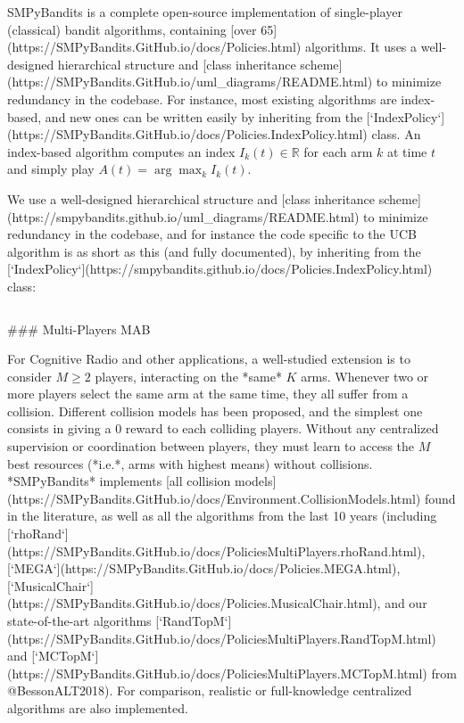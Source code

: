 SMPyBandits is a complete open-source implementation of single-player (classical) bandit algorithms,
containing [over 65](https://SMPyBandits.GitHub.io/docs/Policies.html) algorithms.
It uses a well-designed hierarchical structure and [class inheritance scheme](https://SMPyBandits.GitHub.io/uml_diagrams/README.html) to minimize redundancy in the codebase.
For instance, most existing algorithms are index-based, and new ones can be written easily by inheriting from the [`IndexPolicy`](https://SMPyBandits.GitHub.io/docs/Policies.IndexPolicy.html) class.
An index-based algorithm computes an index $I_k(t)\in\mathbb{R}$ for each arm $k$ at time $t$ and simply play $A(t) = \arg\max_k I_k(t)$.

We use a well-designed hierarchical structure and [class inheritance scheme](https://smpybandits.github.io/uml_diagrams/README.html) to minimize redundancy in the codebase, and for instance the code specific to the UCB algorithm \cite{LaiRobbins85,Auer02} is as short as this (and fully documented), by inheriting from the [`IndexPolicy`](https://smpybandits.github.io/docs/Policies.IndexPolicy.html) class:

\begin{small}
    \inputminted[linenos=true,numbersep=5pt,frame=lines,framesep=2mm]{python3}{2-Chapters/3-Chapter/src/example_of_a_IndexPolicy_UCB.py}
\end{small}


### Multi-Players MAB

For Cognitive Radio and other applications, a well-studied extension is to consider $M\geq2$ players, interacting on the *same* $K$ arms. Whenever two or more players select the same arm at the same time, they all suffer from a collision.
Different collision models has been proposed, and the simplest one consists in giving a $0$ reward to each colliding players.
Without any centralized supervision or coordination between players, they must learn to access the $M$ best resources (*i.e.*, arms with highest means) without collisions.
*SMPyBandits* implements [all collision models](https://SMPyBandits.GitHub.io/docs/Environment.CollisionModels.html) found in the literature, as well as all the algorithms from the last 10 years (including [`rhoRand`](https://SMPyBandits.GitHub.io/docs/PoliciesMultiPlayers.rhoRand.html), [`MEGA`](https://SMPyBandits.GitHub.io/docs/Policies.MEGA.html), [`MusicalChair`](https://SMPyBandits.GitHub.io/docs/Policies.MusicalChair.html), and our state-of-the-art algorithms [`RandTopM`](https://SMPyBandits.GitHub.io/docs/PoliciesMultiPlayers.RandTopM.html) and [`MCTopM`](https://SMPyBandits.GitHub.io/docs/PoliciesMultiPlayers.MCTopM.html) from @BessonALT2018).
For comparison, realistic or full-knowledge centralized algorithms are also implemented.

